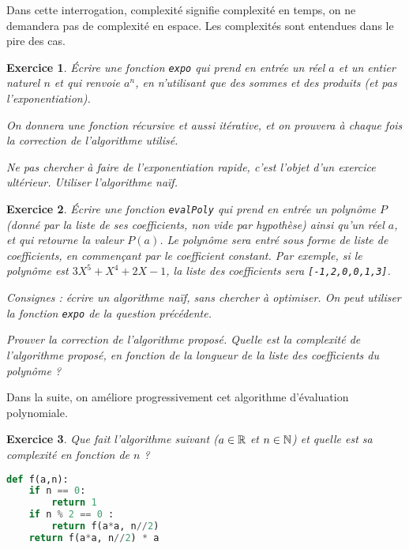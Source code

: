 \documentclass[11pt,a4paper]{article}
\newtheorem{ex}{Exercice}
\begin{document}

Dans cette interrogation, \og complexité\fg{} signifie \og complexité en temps\fg, on ne demandera pas de complexité en espace. Les complexités sont entendues dans le pire des cas.

\begin{ex}
Écrire une fonction \verb+expo+ qui prend en entrée un réel $a$ et un entier naturel $n$ et qui renvoie $a^n$, en n'utilisant que des sommes et des produits (et pas l'exponentiation).

On donnera une fonction récursive et aussi itérative, et on prouvera à chaque fois la correction de l'algorithme utilisé.

Ne pas chercher à faire de l'exponentiation rapide, c'est l'objet d'un exercice ultérieur. Utiliser l'algorithme naïf.
\end{ex}

\begin{ex}
Écrire une fonction \verb+evalPoly+ qui prend en entrée un polynôme $P$ (donné par la liste de ses coefficients, non vide par hypothèse) ainsi qu'un réel $a$, et qui retourne la valeur $P(a)$. Le polynôme sera entré sous forme de liste de coefficients, en commençant par le coefficient constant. Par exemple, si le polynôme est $3X^5+X^4+2X-1$, la liste des coefficients sera \verb+[-1,2,0,0,1,3]+. 

Consignes : écrire un algorithme naïf, sans chercher à optimiser. On peut utiliser la fonction \verb+expo+ de la question précédente.

Prouver la correction de l'algorithme proposé.
Quelle est la complexité de l'algorithme proposé, en fonction de la longueur de la liste des coefficients du polynôme ?
\end{ex}

Dans la suite, on améliore progressivement cet algorithme d'évaluation polynomiale.

\begin{ex}
Que fait l'algorithme suivant ($a\in\mathbb{R}$ et $n\in\mathbb{N}$) et quelle est sa complexité en fonction de $n$ ? 
\begin{lstlisting}[language=Python]
def f(a,n):
	if n == 0:
		return 1
	if n % 2 == 0 :
		return f(a*a, n//2)
	return f(a*a, n//2) * a
\end{lstlisting}
\end{ex}
\end{document}
